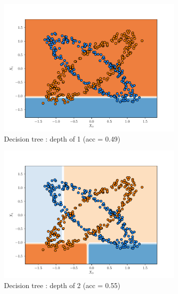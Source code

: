 \begin{figure}[H]
    \centering
    \begin{subfigure}{0.495\textwidth}
        \includegraphics[width=\textwidth]{resources/pdf/make_data2_dt_1.pdf}
        \caption{Decision tree : depth of 1 (acc = \num{0.49})}
    \end{subfigure}
    \begin{subfigure}{0.495\textwidth}
        \includegraphics[width=\textwidth]{resources/pdf/make_data2_dt_2.pdf}
        \caption{Decision tree : depth of 2 (acc = \num{0.55})}
    \end{subfigure}
    \vspace{3pt}
    \begin{subfigure}{0.495\textwidth}

\end{subfigure}
\end{figure}
